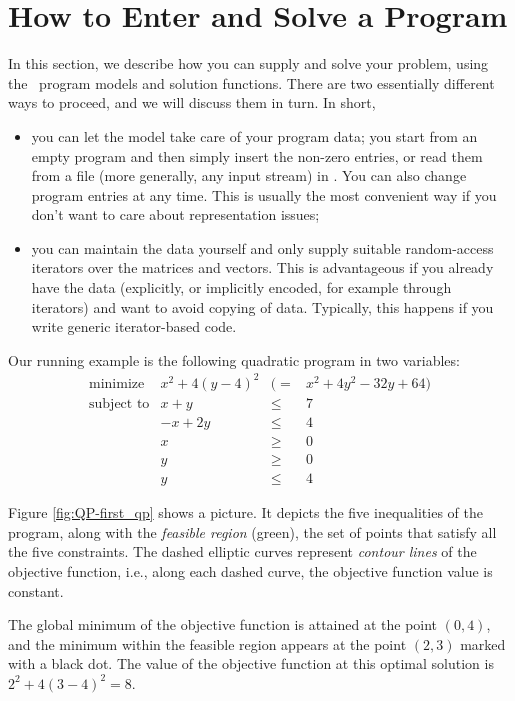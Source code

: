 \section{How to Enter and Solve a Program\label{sec:QP-first}}
In this section, we describe how you can supply and solve your problem, 
using the \cgal\ program models and solution functions. 
There are two essentially different ways to proceed, 
and we will discuss them in turn. In short, 
\begin{itemize}
\item you can let the model take care of your program data; you start 
from an empty program and then simply insert the non-zero entries, or
read them from a file (more generally, any input stream) in 
. You can also change program entries at any time. 
This is usually the most convenient way if you don't want to care
about representation issues;
\item you can maintain the data yourself and only supply suitable 
random-access iterators over the matrices and vectors. This is 
advantageous if you already have the data (explicitly, or implicitly
encoded, for example through iterators) and want to avoid copying 
of data. Typically, this happens if you write generic iterator-based 
code. 
\end{itemize}
 
Our running example is the following quadratic program in two variables:
\[
\begin{array}{lrcl}
\mbox{minimize}       & x^2 + 4(y-4)^2 &(=& x^2 + 4y^2 - 32y + 64) \\
\mbox{subject to}     & x + y &\leq& 7 \\
                      & -x + 2y &\leq& 4 \\
                      & x &\geq& 0 \\
                      & y &\geq& 0 \\
                      & y &\leq& 4
\end{array}
\]

Figure \ref{fig:QP-first_qp} shows a picture. It
depicts the five inequalities of the program, along with the
\emph{feasible region} (green), the set of points that satisfy all the
five constraints. The dashed elliptic curves represent \emph{contour lines} 
of the objective function, i.e., along each dashed curve, the objective
function value is constant. 

The global minimum of the objective function is attained at 
the point $(0,4)$, and the minimum within the feasible region appears
at the point $(2,3)$ marked with a black dot. The value of the objective
function at this optimal solution is $2^2 + 4(3-4)^2 = 8$.

